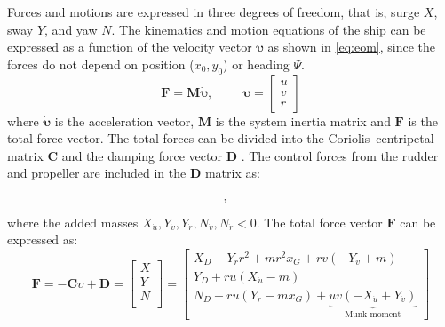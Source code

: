 Forces and motions are expressed in three degrees of freedom, that is, surge $X$, sway $Y$, and yaw $N$. 
The kinematics and motion equations of the ship can be expressed as a function of the velocity vector $\pmb{\bm{\upsilon}}$ as shown in \autoref{eq:eom}, since the forces do not depend on position ($x_0,y_0$) or heading $\Psi$.
\begin{equation}
    \label{eq:eom}
    \mathbf{F} = \mathbf{M}  \pmb{\bm{\dot{\upsilon}}}, \hspace{1cm}
    \pmb{\bm{\upsilon}} = \left[\begin{matrix}u\\v\\r\end{matrix}\right]
\end{equation}
where $\pmb{\bm{\dot{\upsilon}}}$ is the acceleration vector, $\mathbf{M}$ is the system inertia matrix and $\mathbf{F}$ is the total force vector.
The total forces can be divided into the Coriolis–centripetal matrix $\mathbf{C}$ and the damping force vector $\mathbf{D}$ \citep{fossenHandbookMarineCraft2011}. The control forces from the rudder and propeller are included in the $\mathbf{D}$ matrix as:
\begin{equation}
    \label{eq:C_expanded}
    , \hspace{0.3cm}
    
\end{equation}
where the added masses $X_{\dot{u}},Y_{\dot{v}},Y_{\dot{r}},N_{\dot{v}},N_{\dot{r}} < 0$. The total force vector $\mathbf{F}$ can be expressed as:
\begin{equation}
    \label{eq:F_expanded}
\mathbf{F} = - \mathbf{C} \upsilon + \mathbf{D} =
\left[\begin{matrix}
X \\
Y \\
N \\
\end{matrix}\right]
=
\left[\begin{matrix}X_{D} - Y_{\dot{r}} r^{2} + m r^{2} x_{G} + r v \left(- Y_{\dot{v}} + m\right)\\Y_{D} + r u \left(X_{\dot{u}} - m\right)\\N_{D} + r u \left(Y_{\dot{r}} - m x_{G}\right) + \underbrace{u v \left(- X_{\dot{u}} + Y_{\dot{v}}\right)}_{\text{Munk moment}} \end{matrix}\right]
\end{equation}

